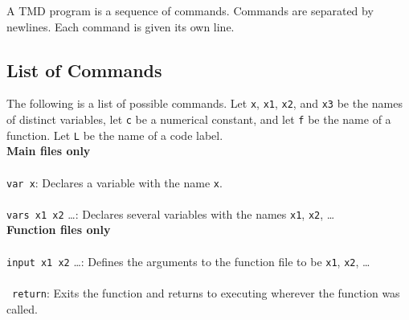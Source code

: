 \documentclass{report}
\begin{document}
A TMD program is a sequence of commands. Commands are separated by newlines. Each command is given its own line. \\

\subsection{List of Commands}

The following is a list of possible commands. Let \texttt{x}, \texttt{x1}, \texttt{x2}, and \texttt{x3} be the names of distinct variables, let \texttt{c} be a numerical constant, and let \texttt{f} be the name of a function. Let \texttt{L} be the name of a code label. \\

\textbf{Main files only} \\ \\
\texttt{var x}: Declares a variable with the name \texttt{x}. \\ \\
\texttt{vars x1 x2} \dots: Declares several variables with the names \texttt{x1}, \texttt{x2}, \dots \\

\textbf{Function files only} \\ \\
\texttt{input x1 x2} \dots: Defines the arguments to the function file to be \texttt{x1}, \texttt{x2}, \dots \\ \\\
\texttt{return}: Exits the function and returns to executing wherever the function was called. \\
\end{document}
